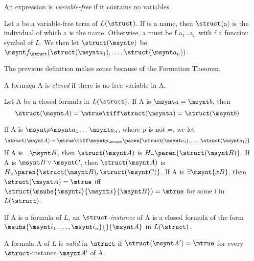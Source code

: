 \begin{definition}
	An expression is \emph{variable-free} if it contains no variables.
\end{definition}

\begin{definition}
	Let \synt a be a variable-free term of $L(\struct)$. If \synt is a name, then
	$\struct$(\synt a) is the individual of which \synt a is the name. Otherwise,
	\synt a must be \synt f \synt a$_1$\dots\synt a$_n$ with \synt f a function
	symbol of $L$. We then let $\struct(\msynt a)$ be 
	$\msynt f_\struct(\struct(\msynt a_1), \dots, \struct(\msynt a_n))$.
\end{definition}

\begin{remark}
	The previous definition makes sense because of the Formation Theorem.
\end{remark}

\begin{definition}
	A formuça \synt A is \emph{closed} if there is no free variable in \synt A.
\end{definition}

\begin{definition}
	Let \synt A be a closed formula in $L(\struct)$. If \synt A is $\msynt a = \msynt b$,
	then \[\struct(\msynt A) = \mtrue \tiff \struct(\msynt a)=\struct(\msynt b)\]

	If \synt A is $\msynt p \msynt a_1 \dots \msynt a_n$, where \synt p is not =,
	we let 
	\[\struct(\msynt A) = \mtrue \tiff \msynt p_\struct\paren{\struct(\msynt a_1),\dots,\struct(\msynt a_1)}\]
	If \synt A is $\lnot \msynt B$, then $\struct(\msynt  A)$ is
	$H_\lnot\paren{\struct(\msynt B)}$. If \synt A is $\msynt B \lor \msynt C$, then
	$\struct(\msynt  A)$ is $H_\lor\paren{\struct(\msynt B),\struct(\msynt C)}$.
	If \synt A is $\exists \msynt{xB}$, then $\struct(\msynt A) = \mtrue$ iff 
	$\struct(\msubs{\msynt i}{\msynt x}{\msynt B})=\mtrue$ for some \synt i in
	$L(\struct)$.
\end{definition}

\begin{definition}
	If \synt A is a formula of $L$, an \emph{$\struct$-instance} of \synt A
	is a closed formula of the form
	$\msubs{\msynt i_1,\dots,\msynt i_n}{}{\msynt A}$ in $L(\struct)$.
\end{definition}

\begin{definition}
	A formula \synt A of $L$ is \emph{valid} in $\struct$ if $\struct(\msynt A')=\mtrue$
	for every $\struct$-instance $\msynt A'$ of \synt A.
\end{definition}

